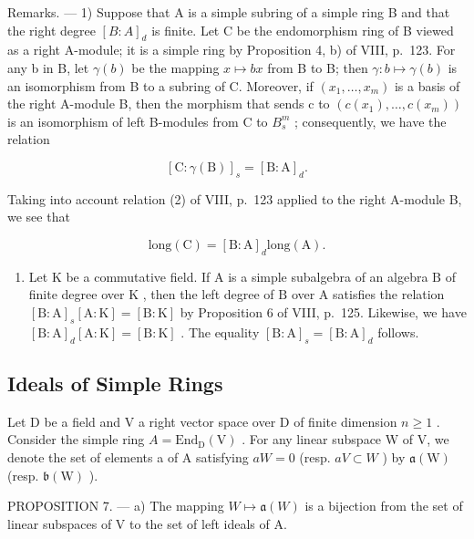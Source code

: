 Remarks. --- 1) Suppose that A is a simple subring of a simple ring B and that the right degree \([B : A]_{d}\) is finite. Let C be the endomorphism ring of B viewed as a right A-module; it is a simple ring by Proposition 4, b) of VIII, p.~123. For any b in B, let \(\gamma(b)\) be the mapping \(x \mapsto bx\) from B to B; then \(\gamma : b \mapsto \gamma(b)\) is an isomorphism from B to a subring of C. Moreover, if \((x_{1}, \ldots, x_{m})\) is a basis of the right A-module B, then the morphism that sends c to \((c(x_{1}), \ldots, c(x_{m}))\) is an isomorphism of left B-modules from C to \(B_{s}^{m}\) ; consequently, we have the relation

\[
[ \mathrm{C}: \gamma (\mathrm{B}) ] _ {s} = [ \mathrm{B}: \mathrm{A} ] _ {d}.\tag{4}
\]

Taking into account relation (2) of VIII, p.~123 applied to the right A-module B, we see that

\[
\mathrm{long} (\mathrm{C}) = [ \mathrm{B}: \mathrm{A} ] _ {d} \mathrm{long} (\mathrm{A}).\tag{5}
\]

\begin{enumerate}
\def\labelenumi{\arabic{enumi})}
\setcounter{enumi}{1}
\tightlist
\item
  Let \(\mathrm{K}\) be a commutative field. If \(\mathrm{A}\) is a simple subalgebra of an algebra \(\mathrm{B}\) of finite degree over \(\mathrm{K}\) , then the left degree of \(\mathrm{B}\) over \(\mathrm{A}\) satisfies the relation \(\left[\mathrm{B}:\mathrm{A}\right]_s[\mathrm{A}:\mathrm{K}] = [\mathrm{B}:\mathrm{K}]\) by Proposition 6 of VIII, p.~125. Likewise, we have \(\left[\mathrm{B}:\mathrm{A}\right]_d[\mathrm{A}:\mathrm{K}] = [\mathrm{B}:\mathrm{K}]\) . The equality \(\left[\mathrm{B}:\mathrm{A}\right]_s = \left[\mathrm{B}:\mathrm{A}\right]_d\) follows.
\end{enumerate}

\subsection{Ideals of Simple Rings}

Let D be a field and V a right vector space over D of finite dimension \(n \geqslant 1\) . Consider the simple ring \(A = \text{End}_{\text{D}}(\text{V})\) . For any linear subspace W of V, we denote the set of elements a of A satisfying \(aW = 0\) (resp. \(aV \subset W\) ) by \(\mathfrak{a}(\text{W})\) (resp. \(\mathfrak{b}(\text{W})\) ).

PROPOSITION 7. --- a) The mapping \(W \mapsto \mathfrak{a}(W)\) is a bijection from the set of linear subspaces of V to the set of left ideals of A.

